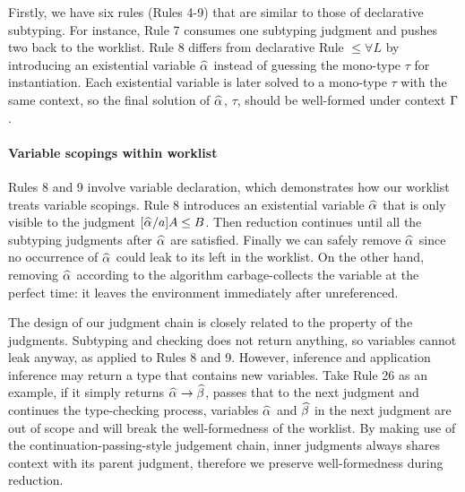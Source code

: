 Firstly, we have six rules (Rules 4-9) that are similar to those of declarative subtyping.
For instance, Rule 7 consumes one subtyping judgment and pushes two back to the worklist.
Rule 8 differs from declarative Rule ${\le}{\forall}L$ by introducing an existential variable $\al$ instead of guessing the mono-type $\tau$ for instantiation.
Each existential variable is later solved to a mono-type $\tau$ with the same context,
so the final solution of $\al$, $\tau$, should be well-formed under context $\Gamma$.

\paragraph{Variable scopings within worklist}
Rules 8 and 9 involve variable declaration, which demonstrates how our worklist treats variable scopings.
Rule 8 introduces an existential variable $\al$ that is only visible to the judgment $[\al/a]A \le B$.
Then reduction continues until all the subtyping judgments after $\al$ are satisfied.
Finally we can safely remove $\al$ since no occurrence of $\al$ could leak to its left in the worklist.
On the other hand, removing $\al$ according to the algorithm carbage-collects the variable at the perfect time: it leaves the environment immediately after unreferenced.

The design of our judgment chain is closely related to the property of the judgments.
Subtyping and checking does not return anything, so variables cannot leak anyway, as applied to Rules 8 and 9.
However, inference and application inference may return a type that contains new variables.
Take Rule 26 as an example, if it simply returns $\al \to \bt$, passes that to the next judgment and continues the type-checking process,
variables $\al$ and $\bt$ in the next judgment are out of scope
and will break the well-formedness of the worklist.
By making use of the continuation-passing-style judgement chain,
inner judgments always shares context with its parent judgment,
therefore we preserve well-formedness during reduction.

